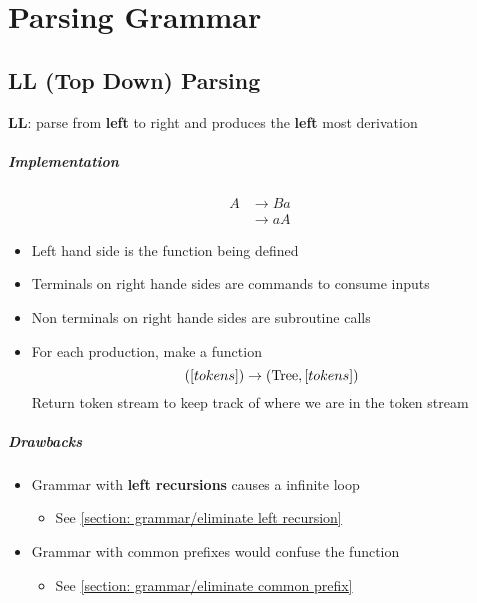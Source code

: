 \chapter{Parsing Grammar}

\section{LL (Top Down) Parsing}

  \begin{definition}
    \textbf{LL}: parse from \textbf{left} to right and produces the
    \textbf{left} most derivation
  \end{definition}

  \paragraph{Implementation}
  \begin{align*}
    A
    &\to B a \\
    &\to a A
  \end{align*}
  \begin{itemize}
    \item Left hand side is the function being defined
    \item Terminals on right hande sides are commands to consume inputs
    \item Non terminals on right hande sides are subroutine calls
    \item For each production, make a function
    \begin{equation*}
      \left( \left[ tokens \right] \right) \to
      \left( \operatorname{Tree}, \left[ tokens \right] \right)
    \end{equation*}
    Return token stream to keep track of where we are in the token stream
  \end{itemize}

  \paragraph{Drawbacks}
  \begin{itemize}
    \item Grammar with \textbf{left recursions} causes a infinite loop
    \begin{itemize}
      \item See \ref{section: grammar/eliminate left recursion}
    \end{itemize}
    \item Grammar with common prefixes would confuse the function
    \begin{itemize}
      \item See \ref{section: grammar/eliminate common prefix}
    \end{itemize}
  \end{itemize}

